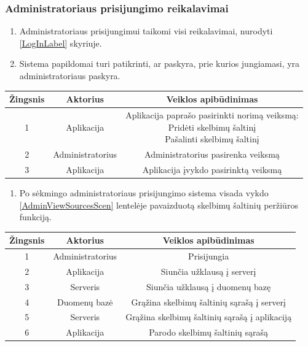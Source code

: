 \documentclass[12pt]{article}
\begin{document}
	\subsubsection{Administratoriaus prisijungimo reikalavimai}
	\begin{enumerate}[labelindent=10pt,leftmargin=2.2cm]
		\item Administratoriaus prisijungimui taikomi visi reikalavimai, nurodyti \ref{LogInLabel} skyriuje.
		\item Sistema papildomai turi patikrinti, ar paskyra, prie kurios jungiamasi, yra administratoriaus paskyra.
	\end{enumerate}
		
		\begin{center}
		\begin{tabular}{ | c | c | c | }
			\hline
			Žingsnis & Aktorius         & Veiklos apibūdinimas \\ \hline
			1        & Aplikacija       & \makecell{Aplikacija paprašo pasirinkti norimą veiksmą: \\ Pridėti skelbimų šaltinį \\ Pašalinti skelbimų šaltinį} \\ \hline
			2        & Administratorius & Administratorius pasirenka veiksmą \\ \hline
			3        & Aplikacija       & Aplikacija įvykdo pasirinktą veiksmą \\ \hline
		\end{tabular}
		\end{center}
		\bigskip
		
	\begin{enumerate}[resume,labelindent=10pt,leftmargin=2.2cm]
		\item Po sėkmingo administratoriaus prisijungimo sistema visada vykdo \ref{AdminViewSourcesScen} lentelėje pavaizduotą skelbimų šaltinių peržiūros funkciją.
	\end{enumerate}

		\begin{center}
		\begin{tabular}{ | c | c | c | }
			\hline
			Žingsnis & Aktorius         & Veiklos apibūdinimas \\ \hline
			1        & Administratorius & Prisijungia \\ \hline
			2        & Aplikacija       & Siunčia užklausą į serverį \\ \hline
			3        & Serveris         & Siunčia užklausą į duomenų bazę \\ \hline
			4        & Duomenų bazė     & Grąžina skelbimų šaltinių sąrašą į serverį \\ \hline
			5        & Serveris         & Grąžina skelbimų šaltinių sąrašą į aplikaciją \\ \hline
			6        & Aplikacija       & Parodo skelbimų šaltinių sąrašą \\ \hline
		\end{tabular}
		\end{center}
		\pagebreak
	
\end{document}

